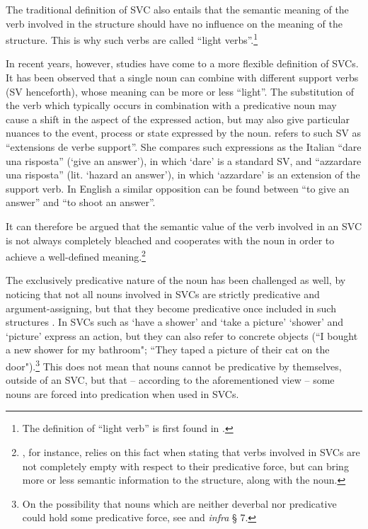 \documentclass[output=paper,colorlinks,citecolor=brown]{langscibook}
\begin{document}
The traditional definition of SVC also entails that the semantic meaning of the verb involved in the structure should have no influence on the meaning of the structure. This is why such verbs are called “light verbs”.\footnote{The definition of “light verb” is first found in \citet[117]{Jespersen1942}.}

In recent years, however, studies have come to a more flexible definition of SVCs. It has been observed that a single noun can combine with different support verbs (SV henceforth), whose meaning can be more or less “light”. The substitution of the verb which typically occurs in combination with a predicative noun may cause a shift in the aspect \citep[349–353]{gross_pour_2004} of the expressed action, but may also give particular nuances to the event, process or state expressed by the noun. \citet{jezek2004types} refers to such SV as “extensions de verbe support”. She compares such expressions as the Italian “dare una risposta” (‘give an answer'), in which ‘dare' is a standard SV, and “azzardare una risposta” (lit. ‘hazard an answer'), in which ‘azzardare' is an extension of the support verb. In English a similar opposition can be found between “to give an answer” and “to shoot an answer”.

It can therefore be argued that the semantic value of the verb involved in an SVC is not always completely bleached and cooperates with the noun in order to achieve a well-defined meaning.\footnote{\citet[115--117]{Pompei2017}, for instance, relies on this fact when stating that verbs involved in SVCs are not completely empty with respect to their predicative force, but can bring more or less semantic information to the structure, along with the noun.}

The exclusively predicative nature of the noun has been challenged as well, by noticing that not all nouns involved in SVCs are strictly predicative and argument-assigning, but that they become predicative once included in such structures \citep[168--171]{Bowern2008}. In SVCs such as ‘have a shower’ and ‘take a picture’ ‘shower’ and ‘picture’ express an action, but they can also refer to concrete objects (“I bought a new shower for my bathroom"; “They taped a picture of their cat on the door").\footnote{On the possibility that nouns which are neither deverbal nor predicative could hold some predicative force, see \citet{SimonePompei2007} and \textit{infra} § 7.}  This does not mean that nouns cannot be predicative by themselves, outside of an SVC, but that – according to the aforementioned view – some nouns are forced into predication when used in SVCs.
\end{document}
